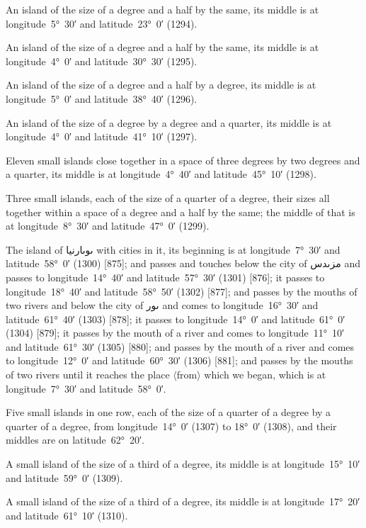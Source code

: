 \documentclass[11pt]{article}
\newcommand{\Pg}[1]{\marginpar{\footnotesize #1}}
\newcommand{\Ang}[1]{\ensuremath{#1}}
\begin{document}
An island of the size of a degree and a half by the same, its middle is at longitude~5°~30′ and latitude~23°~0′ (1294).

\Pg{p. 85}An island of the size of a degree and a half by the same, its middle is at longitude~4°~0′ and latitude~30°~30′ (1295).

An island of the size of a degree and a half by a degree, its middle is at longitude~5°~0′ and latitude~38°~40′ (1296).

An island of the size of a degree by a degree and a quarter, its middle is at longitude~4°~0′ and latitude~41°~10′ (1297).

Eleven small islands close together in a space of three degrees by two degrees and a quarter, its middle is at longitude~4°~40′ and latitude~45°~10′ (1298).

Three small islands, each of the size of a quarter of a degree, their sizes all together within a space of a degree and a half by the same; the middle of that is at longitude~8°~30′ and latitude~47°~0′ (1299).

The island of \textarabic{ٮوٮارنيا} with cities in it, its beginning is at longitude~7°~30′ and latitude~58°~0′ (1300) [875]; and passes and touches below the city of \textarabic{مزٮدس} and passes to longitude~14°~40′ and latitude~57°~30′ (1301) [876]; it passes to longitude~18°~40′ and latitude~58°~50′ (1302) [877]; and passes by the mouths of two rivers and below the city of \textarabic{ٮور} and comes to longitude~16°~30′ and latitude~61°~40′ (1303) [878]; it passes to longitude~14°~0′ and latitude~61°~0′ (1304) [879]; it passes by the mouth of a river and comes to longitude~11°~10′ and latitude~61°~30′ (1305) [880]; and passes by the mouth of a river and comes to longitude~12°~0′ and latitude~60°~30′ (1306) [881]\Pg{p. 86}; and passes by the mouths of two rivers until it reaches the place \Ang{\langle}from\Ang{\rangle} which we began, which is at longitude~7°~30′ and latitude~58°~0′.

Five small islands in one row, each of the size of a quarter of a degree by a quarter of a degree, from longitude~14°~0′ (1307) to 18°~0′ (1308), and their middles are on latitude~62°~20′.

A small island of the size of a third of a degree, its middle is at longitude~15°~10′ and latitude~59°~0′ (1309).

A small island of the size of a third of a degree, its middle is at longitude~17°~20′ and latitude~61°~10′ (1310).
\end{document}
